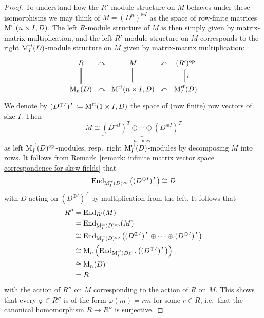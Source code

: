 \begin{proof}
  To understand how the $R'$-module structure on $M$ behaves under these isomorphisms we may think of $M = (D^n)^{\oplus I}$ as the space of row-finite matrices $\operatorname{M}^{{\operatorname{rf}}}(n \times I, D)$.
  The left $R$-module structure of $M$ is then simply given by matrix-matrix multiplication, and the left $R'$-module structure on $M$ corresponds to the right $\operatorname{M}_I^{{\operatorname{rf}}}(D)$-module structure on $M$ given by matrix-matrix multiplication:
  \[
    \begin{tikzcd}[column sep = 0em]
        R
        \arrow[equal]{d}
      &\curvearrowright
      & M
        \arrow[equal]{d}
      & \curvearrowleft
      & (R')^\op
        \arrow[equal]{d}[right]{\rotatebox[origin=c]{90}{$\sim$}}
      \\
        \Mat_n(D)
      & \curvearrowright
      & \Mat^{\rf}(n \times I, D)
      & \curvearrowleft
      & \Mat_I^{\rf}(D)
    \end{tikzcd}
  \]
  We denote by $(D^{\oplus I})^T \coloneqq \operatorname{M}^{\operatorname{rf}}(1 \times I, D)$ the space of (row finite) row vectors of size $I$.
  Then
  \[
          M
    \cong \underbrace{ (D^{\oplus I})^T \oplus \dotsb \oplus (D^{\oplus I})^T }_{\text{$n$ times}}
  \]
  as left $\operatorname{M}_I^{{\operatorname{rf}}}(D)^{\operatorname{op}}$-modules, resp.\ right $\operatorname{M}_I^{{\operatorname{rf}}}(D)$-modules by decomposing $M$ into rows.
  It follows from Remark~\ref{remark: infinite matrix vector space correspondence for skew fields} that
  \[
          \operatorname{End}_{ \operatorname{M}_I^{{\operatorname{rf}}}(D)^{\operatorname{op}} }\left( (D^{\oplus I})^T \right) 
    \cong D
  \]
  with $D$ acting on $(D^{\oplus I})^T$ by multiplication from the left.
  It follows that
  \begin{align*}
            R''
    &=      \operatorname{End}_{R'}(M)  \\
    &=      \operatorname{End}_{ \operatorname{M}_I^{{\operatorname{rf}}}(D)^{\operatorname{op}} }( M )   \\
    &\cong  \operatorname{End}_{ \operatorname{M}_I^{{\operatorname{rf}}}(D)^{\operatorname{op}} }\left( (D^{\oplus I})^T \oplus \dotsb \oplus (D^{\oplus I})^T \right) \\
    &\cong  \operatorname{M}_n\left( \operatorname{End}_{ \operatorname{M}_I^{{\operatorname{rf}}}(D)^{\operatorname{op}} }\left( (D^{\oplus I})^T \right) \right)  \\
    &\cong  \operatorname{M}_n(D) \\
    &=      R
  \end{align*}
  with the action of $R''$ on $M$ corresponding to the action of $R$ on $M$.
  This shows that every $\varphi \in R''$ is of the form $\varphi(m) = rm$ for some $r \in R$, i.e.\ that the canonical homomorphism $R \to R''$ is surjective.
\end{proof}







